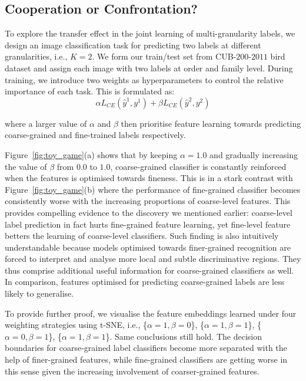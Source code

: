 \documentclass[final]{cvpr}
\begin{document}
\subsection{Cooperation or Confrontation?}\label{Cooperation_or_Confrontation}


To explore the transfer effect in the joint learning of multi-granularity labels, we design an image classification task for predicting two labels at different granularities, i.e., $K=2$. We form our train/test set from CUB-$200$-$2011$ bird dataset and assign each image with two labels at order and family level. During training, we introduce two weights as hyperparameters to control the relative importance of each task. This is formulated as:
\begin{equation}
\alpha L_{CE}(\hat{y}^1, y^{1})+\beta L_{CE}(\hat{y}^2, y^{2}) 
\end{equation}

\noindent where a larger value of $\alpha$ and $\beta$ then prioritise feature learning towards predicting coarse-grained and fine-trained labels respectively.

Figure~\ref{fig:toy_game}(a) shows that by keeping $\alpha=1.0$ and gradually increasing the value of $\beta$ from $0.0$ to $1.0$, coarse-grained classifier is constantly reinforced when the features is optimised towards fineness. This is in a stark contrast with Figure~\ref{fig:toy_game}(b) where the performance of fine-grained classifier becomes consistently worse with the increasing proportions of coarse-level features. This provides compelling evidence to the discovery we mentioned earlier: coarse-level label prediction in fact hurts fine-grained feature learning, yet fine-level feature betters the learning of coarse-level classifiers. Such finding is also intuitively understandable because models optimised towards finer-grained recognition are forced to interpret and analyse more local and subtle discriminative regions. They thus comprise additional useful information for coarse-grained classifiers as well. In comparison, features optimised for predicting coarse-grained labels are less likely to generalise.

To provide further proof, we visualise the feature embeddings learned under four weighting strategies using t-SNE, i.e., \{$\alpha=1, \beta=0$\}, \{$\alpha=1, \beta=1$\}, \{$\alpha=0, \beta=1$\}, \{$\alpha=1, \beta=1$\}. Same conclusions still hold. The decision boundaries for coarse-grained label classifiers become more separated with the help of finer-grained features, while fine-grained classifiers are getting worse in this sense given the increasing involvement of coarser-grained features.
\end{document}
